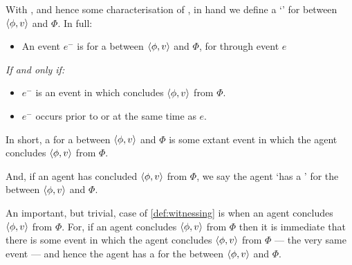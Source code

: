 \begin{note}
  With \supportI{}, and hence some characterisation of \ros{}, in hand we define a `' for \ros{} between \(\langle \phi, v \rangle\) and \(\Phi\).
  In full:

  \begin{definition}%
    \label{def:witnessing}%
    \vspace{-\baselineskip}
    \begin{itemize}
    \item
      An event \(e^{-}\) is \emph{} for a \ros{} between \(\langle \phi, v \rangle\) and \(\Phi\), for \vAgent{} through event \(e\)
    \end{itemize}

    \emph{If and only if:}

    \begin{itemize}
    \item
      \(e^{-}\) is an event in which \vAgent{} concludes \(\langle \phi, v \rangle\) from \(\Phi\).
    \item
      \(e^{-}\) occurs prior to or at the same time as \(e\).
    \end{itemize}
    \vspace{-\baselineskip}
  \end{definition}

  \noindent%
  In short, a \wit{} for a \ros{} between \(\langle \phi, v \rangle\) and \(\Phi\) is some extant event in which the agent concludes \(\langle \phi, v \rangle\) from \(\Phi\).

  And, if an agent has concluded \(\langle \phi, v \rangle\) from \(\Phi\), we say the agent `has a \wit{}' for the \ros{} between \(\langle \phi, v \rangle\) and \(\Phi\).
\end{note}


\begin{note}
  An important, but trivial, case of \autoref{def:witnessing} is when an agent concludes \(\langle \phi, v \rangle\) from \(\Phi\).
  For, if an agent concludes \(\langle \phi, v \rangle\) from \(\Phi\) then it is immediate that there is some event in which the agent concludes \(\langle \phi, v \rangle\) from \(\Phi\) --- the very same event --- and hence the agent has a \wit{} for the \ros{} between \(\langle \phi, v \rangle\) and \(\Phi\).
\end{note}


